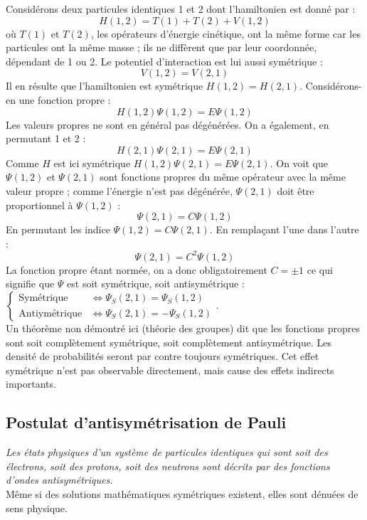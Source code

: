 \documentclass	[11pt, a4paper, openany]{book}
\begin{document}
	Considérons deux particules identiques 1 et 2 dont l'hamiltonien est donné par :
	\begin{equation}
		H(1,2) = T(1)+T(2) + V(1,2)
	\end{equation}
	où $T(1)$ et $T(2)$, les opérateurs d'énergie cinétique, ont la même forme car les particules ont la même masse ; ils ne diffèrent que par leur coordonnée, dépendant de 1 ou 2. Le potentiel d'interaction est lui aussi symétrique :
	\begin{equation}
		V(1,2) = V(2,1)
	\end{equation}
	Il en résulte que l'hamiltonien est symétrique $H(1,2) = H(2,1)$. Considérons-en une fonction propre :
	\begin{equation}
		H(1,2)\Psi(1,2) = E\Psi(1,2)
	\end{equation}
	Les valeurs propres ne sont en général pas dégénérées. On a également, en permutant 1 et 2 :
	\begin{equation}
		H(2,1)\Psi(2,1) = E\Psi(2,1)
	\end{equation}
	Comme $H$ est ici symétrique $H(1,2)\Psi(2,1) = E\Psi(2,1)$. On voit que $\Psi(1,2)$ et $\Psi(2,1)$ sont fonctions propres du même opérateur avec la même valeur propre ; comme l'énergie n'est pas dégénérée, $\Psi(2,1)$ doit être proportionnel à $\Psi(1,2)$ :
	\begin{equation}
		\Psi(2,1) = C\Psi(1,2)
	\end{equation}
	En permutant les indice $\Psi(1,2) = C\Psi(2,1)$. En remplaçant l'une dans l'autre :
	\begin{equation}
		\Psi(2,1) = C^2\Psi(1,2)
	\end{equation}
	La fonction propre étant normée, on a donc obligatoirement $C = \pm 1$ ce qui signifie que $\Psi$ est soit symétrique, soit antisymétrique :
	$\left\{\begin{array}{ll}
	\text{Symétrique} &\Leftrightarrow \Psi_S(2,1) = \Psi_S(1,2)\\
	\text{Antiymétrique} &\Leftrightarrow \Psi_S(2,1) = -\Psi_S(1,2)
	\end{array}\right.$.\\
	Un théorème non démontré ici (théorie des groupes) dit que les fonctions propres sont soit complètement symétrique, soit complètement antisymétrique. Les densité de probabilités seront par contre toujours symétriques. Cet effet symétrique n'est pas observable directement, mais cause des effets indirects importants.
	
	\subsection{Postulat d'antisymétrisation de Pauli}
	\textit{Les états physiques d'un système de particules identiques qui sont soit des électrons, soit des protons, soit des neutrons sont décrits par des fonctions d'ondes antisymétriques.}\\
	Même si des solutions mathématiques symétriques existent, elles sont dénuées de sens physique.\\
	
\end{document}
